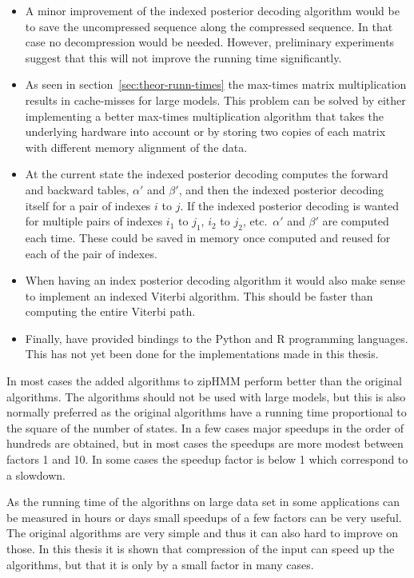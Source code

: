 \begin{itemize}
\item A minor improvement of the indexed posterior decoding algorithm would be
  to save the uncompressed sequence along the compressed sequence. In that case
  no decompression would be needed. However, preliminary experiments suggest
  that this will not improve the running time significantly.
\item As seen in section~\ref{sec:theor-runn-times} the max-times matrix
  multiplication results in cache-misses for large models. This problem can be
  solved by either implementing a better max-times multiplication algorithm
  that takes the underlying hardware into account or by storing two copies of
  each matrix with different memory alignment of the data.
\item At the current state the indexed posterior decoding computes the forward
  and backward tables, $\alpha'$ and $\beta'$, and then the indexed posterior
  decoding itself for a pair of indexes $i$ to $j$. If the indexed posterior
  decoding is wanted for multiple pairs of indexes $i_1$ to $j_1$, $i_2$ to
  $j_2$, etc.\ $\alpha'$ and $\beta'$ are computed each time. These could be
  saved in memory once computed and reused for each of the pair of indexes.
\item When having an index posterior decoding algorithm it would also make
  sense to implement an indexed Viterbi algorithm. This should be faster than
  computing the entire Viterbi path.
\item Finally, \citet{sand2013ziphmmlib} have provided bindings to the Python
  and R programming languages. This has not yet been done for the
  implementations made in this thesis.
\end{itemize}

In most cases the added algorithms to zipHMM perform better than the original
algorithms. The algorithms should not be used with large models, but this is
also normally preferred as the original algorithms have a running time
proportional to the square of the number of states. In a few cases major
speedups in the order of hundreds are obtained, but in most cases the speedups
are more modest between factors 1 and 10. In some cases the speedup factor is
below 1 which correspond to a slowdown.

As the running time of the algorithns on large data set in some applications
can be measured in hours or days small speedups of a few factors can be very
useful. The original algorithms are very simple and thus it can also hard to
improve on those. In this thesis it is shown that compression of the input can
speed up the algorithms, but that it is only by a small factor in many cases.

